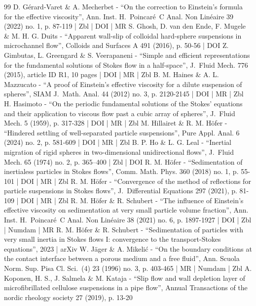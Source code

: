 \begin{thebibliography}{99}
D. Gérard-Varet \& A. Mecherbet - “On the correction to Einstein’s formula for the effective viscosity”, Ann. Inst. H. Poincaré C Anal. Non Linéaire 39 (2022) no. 1, p. 87-119 | Zbl | DOI | MR
S. Ghosh, D. van den Ende, F. Mugele \& M. H. G. Duits - “Apparent wall-slip of colloidal hard-sphere suspensions in microchannel flow”, Colloids and Surfaces A 491 (2016), p. 50-56 | DOI
Z. Gimbutas, L. Greengard \& S. Veerapaneni - “Simple and efficient representations for the fundamental solutions of Stokes flow in a half-space”, J. Fluid Mech. 776 (2015), article ID R1, 10 pages | DOI | MR | Zbl
B. M. Haines \& A. L. Mazzucato - “A proof of Einstein’s effective viscosity for a dilute suspension of spheres”, SIAM J. Math. Anal. 44 (2012) no. 3, p. 2120-2145 | DOI | MR | Zbl
H. Hasimoto - “On the periodic fundamental solutions of the Stokes’ equations and their application to viscous flow past a cubic array of spheres”, J. Fluid Mech. 5 (1959), p. 317-328 | DOI | MR | Zbl
M. Hillairet \& R. M. Höfer - “Hindered settling of well-separated particle suspensions”, Pure Appl. Anal. 6 (2024) no. 2, p. 581-609 | DOI | MR | Zbl
B. P. Ho \& L. G. Leal - “Inertial migration of rigid spheres in two-dimensional unidirectional flows”, J. Fluid Mech. 65 (1974) no. 2, p. 365–400 | Zbl | DOI
R. M. Höfer - “Sedimentation of inertialess particles in Stokes flows”, Comm. Math. Phys. 360 (2018) no. 1, p. 55-101 | DOI | MR | Zbl
R. M. Höfer - “Convergence of the method of reflections for particle suspensions in Stokes flows”, J. Differential Equations 297 (2021), p. 81-109 | DOI | MR | Zbl
R. M. Höfer \& R. Schubert - “The influence of Einstein’s effective viscosity on sedimentation at very small particle volume fraction”, Ann. Inst. H. Poincaré C Anal. Non Linéaire 38 (2021) no. 6, p. 1897-1927 | DOI | Zbl | Numdam | MR
R. M. Höfer \& R. Schubert - “Sedimentation of particles with very small inertia in Stokes flows I: convergence to the transport-Stokes equations”, 2023 | arXiv
W. Jäger \& A. Mikelić - “On the boundary conditions at the contact interface between a porous medium and a free fluid”, Ann. Scuola Norm. Sup. Pisa Cl. Sci. (4) 23 (1996) no. 3, p. 403-465 | MR | Numdam | Zbl
A. Koponen, H. S., J. Salmela \& M. Kataja - “Slip flow and wall depletion layer of microfibrillated cellulose suspensions in a pipe flow”, Annual Transactions of the nordic rheology society 27 (2019), p. 13-20

\end{thebibliography}
